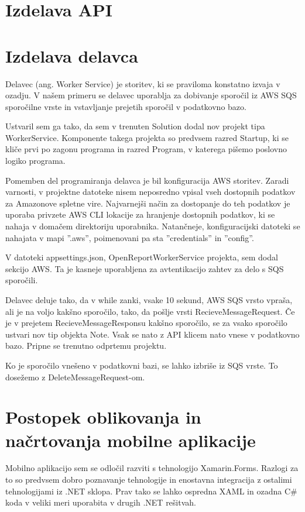 \documentclass[a4paper, 12pt]{book}
\begin{document}
\section{Izdelava API}

\section{Izdelava delavca}

Delavec (ang. Worker Service) je storitev, ki se praviloma konstatno izvaja v ozadju.
V našem primeru se delavec uporablja za dobivanje sporočil iz AWS SQS sporočilne vrste in vstavljanje prejetih sporočil v podatkovno bazo.

Ustvaril sem ga tako, da sem v trenuten Solution dodal nov projekt tipa WorkerService.
Komponente takega projekta so predvsem razred Startup, ki se kliče prvi po zagonu programa in razred Program, v katerega pišemo poslovno logiko programa.

Pomemben del programiranja delavca je bil konfiguracija AWS storitev.
Zaradi varnosti, v projektne datoteke nisem neposredno vpisal vseh dostopnih podatkov za Amazonove spletne vire.
Najvarnejši način za dostopanje do teh podatkov je uporaba privzete AWS CLI lokacije za hranjenje dostopnih podatkov, ki se nahaja v domačem direktoriju uporabnika.
Natančneje, konfiguracijski datoteki se nahajata v mapi ''.aws'', poimenovani pa sta ''credentials'' in ''config''.

V datoteki appsettings.json, OpenReportWorkerService projekta, sem dodal sekcijo AWS.
Ta je kasneje uporabljena za avtentikacijo zahtev za delo s SQS sporočili.

Delavec deluje tako, da v while zanki, vsake 10 sekund, AWS SQS vrsto vpraša, ali je na voljo kakšno sporočilo, tako, da pošlje vrsti RecieveMessageRequest. 
Če je v prejetem RecieveMessageResponsu kakšno sporočilo, se za vsako sporočilo ustvari nov tip objekta Note.
Vsak se nato z API klicem nato vnese v podatkovno bazo.
Pripne se trenutno odprtemu projektu.

Ko je sporočilo vnešeno v podatkovni bazi, se lahko izbriše iz SQS vrste.
To dosežemo z DeleteMessageRequest-om.


\section{Postopek oblikovanja in načrtovanja mobilne aplikacije}

Mobilno aplikacijo sem se odločil razviti s tehnologijo Xamarin.Forms.
Razlogi za to so predvsem dobro poznavanje tehnologije in enostavna integracija z ostalimi tehnologijami iz .NET sklopa.
Prav tako se lahko ospredna XAML in ozadna C\# koda v veliki meri uporabita v drugih .NET rešitvah.
\end{document}
